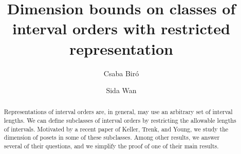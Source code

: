 \documentclass{amsart}
\author{Csaba Bir\'o}
\author{Sida Wan}
\title[Dimension bounds on classes of interval orders]{Dimension bounds on classes of interval orders with restricted representation}
\begin{document}
\begin{abstract}
Representations of interval orders are, in general, may use an arbitrary set of interval lengths. We can define subclasses of interval orders by restricting the allowable lengths of intervals. Motivated by a recent paper of Keller, Trenk, and Young, we study the dimension of posets in some of these subclasses. Among other results, we answer several of their questions, and we simplify the proof of one of their main results.
\end{abstract}

\maketitle










\end{document}
